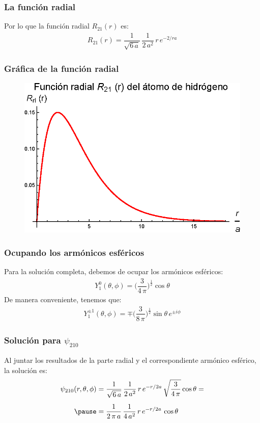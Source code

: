 \documentclass[12pt]{beamer}
\begin{document}
\begin{frame}
\frametitle{La función radial}
Por lo que la función radial $R_{21} (r)$ es:
\pause
\begin{align*}
R_{21} (r) = \dfrac{1}{\sqrt{6 \, a}} \, \dfrac{1}{2 \, a^{2}} \, r \, e^{-2/ra}
\end{align*}
\end{frame}
\begin{frame}
\frametitle{Gráfica de la función radial}
\begin{figure}
   \centering
   \includegraphics[scale=1]{Imagenes/Plot_Hermite_Radial_21.eps}
\end{figure}
\end{frame}
\begin{frame}
\frametitle{Ocupando los armónicos esféricos}
Para la solución completa, debemos de ocupar los armónicos esféricos:
\pause
\begin{align*}
Y_{1}^{0} (\theta, \phi) = \bigg( \dfrac{3}{4 \, \pi} \bigg)^{\frac{1}{2}} \cos \theta
\end{align*}
\pause
De manera conveniente, tenemos que:
\pause
\begin{align*}
Y_{1}^{\pm 1} (\theta, \phi) = \mp \bigg( \dfrac{3}{8 \, \pi} \bigg)^{\frac{1}{2}} \sin \theta \, e^{\pm i \phi}
\end{align*}
\end{frame}
\begin{frame}
\frametitle{Solución para $\psi_{210}$}
Al juntar los resultados de la parte radial y el correspondiente armónico esférico, la solución es:
\pause
\begin{eqnarray*}
\begin{aligned}
\psi_{210} (r, \theta, \phi) &= \dfrac{1}{\sqrt{6 \, a}} \, \dfrac{1}{2 \, a^{2}} \, r \, e^{-r/2a} \, \sqrt{\dfrac{3}{4 \, \pi}} \cos \theta = \\[0.5em] \pause
&= \dfrac{1}{2 \, \pi \, a} \, \dfrac{1}{4 \, a^{2}} \, r \, e^{-r/2a} \, \cos \theta
\end{aligned}
\end{eqnarray*}
\end{frame}
\end{document}
